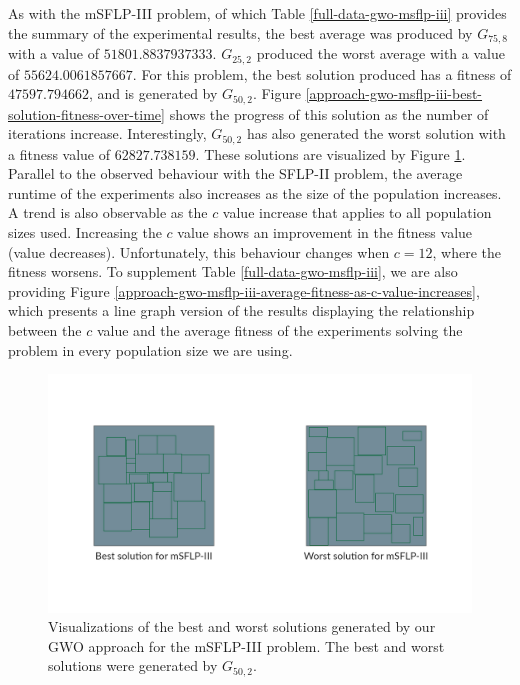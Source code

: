 As with the mSFLP-III problem, of which Table \ref{full-data-gwo-msflp-iii} provides the summary of the experimental results, the best average was produced by $G_{75,8}$ with a value of $51801.8837937333$. $G_{25,2}$ produced the worst average with a value of $55624.0061857667$. For this problem, the best solution produced has a fitness of $47597.794662$, and is generated by $G_{50,2}$. Figure \ref{approach-gwo-msflp-iii-best-solution-fitness-over-time} shows the progress of this solution as the number of iterations increase. Interestingly, $G_{50,2}$ has also generated the worst solution with a fitness value of $62827.738159$. These solutions are visualized by Figure \ref{approach-gwo-msflp-iii-best-and-worst-solutions-visualization}. Parallel to the observed behaviour with the SFLP-II problem, the average runtime of the experiments also increases as the size of the population increases. A trend is also observable as the $c$ value increase that applies to all population sizes used. Increasing the $c$ value shows an improvement in the fitness value (value decreases). Unfortunately, this behaviour changes when $c = 12$, where the fitness worsens. To supplement Table \ref{full-data-gwo-msflp-iii}, we are also providing Figure \ref{approach-gwo-msflp-iii-average-fitness-as-c-value-increases}, which presents a line graph version of the results displaying the relationship between the $c$ value and the average fitness of the experiments solving the problem in every population size we are using.

\begin{figure}[h!]
\centering
\begin{adjustwidth}{-0.45in}{}
	\includegraphics[scale=1.0]{./images/chap07-rd/gwo-msflp-iii-best-and-worst-solutions.png}
\end{adjustwidth}
\caption{Visualizations of the best and worst solutions generated by our GWO approach for the mSFLP-III problem. The best and worst solutions were generated by $G_{50,2}$.}
\label{approach-gwo-msflp-iii-best-and-worst-solutions-visualization}
\end{figure}

